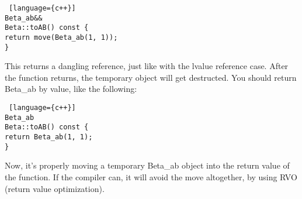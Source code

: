 \begin{note}
\begin{lstlisting} [language={c++}]
Beta_ab&&
Beta::toAB() const {
return move(Beta_ab(1, 1));
}
\end{lstlisting}
This returns a dangling reference, just like with the lvalue reference case. After the function returns, the temporary object will get destructed. You should return Beta\_ab by value, like the following:
\begin{lstlisting} [language={c++}]
Beta_ab
Beta::toAB() const {
return Beta_ab(1, 1);
}
\end{lstlisting}
Now, it's properly moving a temporary Beta\_ab object into the return value of the function. If the compiler can, it will avoid the move altogether, by using RVO (return value optimization).
\end{note}

